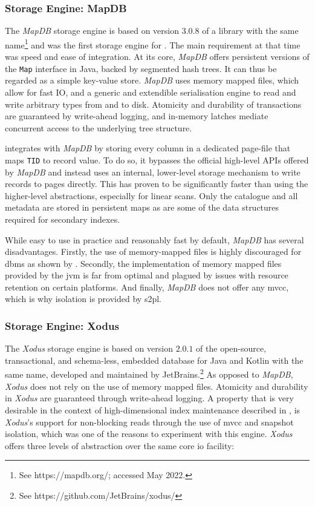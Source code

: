 \subsubsection{Storage Engine: MapDB}

The \emph{MapDB} storage engine is based on version $3.0.8$ of a library with the same name\footnote{See https://mapdb.org/; accessed May 2022.} and was the first storage engine for \cottontail{}. The main requirement at that time was speed and ease of integration. At its core, \emph{MapDB} offers persistent versions of the \texttt{Map} interface in Java, backed by segmented hash trees. It can thus be regarded as a simple key-value store. \emph{MapDB} uses memory mapped files, which allow for fast IO, and a generic and extendible serialisation engine to read and write arbitrary types from and to disk. Atomicity and durability of transactions are guaranteed by write-ahead logging, and in-memory latches mediate concurrent access to the underlying tree structure.

\cottontail{} integrates with \emph{MapDB} by storing every column in a dedicated page-file that maps \texttt{TID} to record value. To do so, it bypasses the official high-level APIs offered by \emph{MapDB} and instead uses an internal, lower-level storage mechanism to write records to pages directly. This has proven to be significantly faster than using the higher-level abstractions, especially for linear scans. Only the catalogue and all metadata are stored in persistent maps as are some of the data structures required for secondary indexes.

While easy to use in practice and reasonably fast by default, \emph{MapDB} has several disadvantages. Firstly, the use of memory-mapped files is highly discouraged for \acrshort{dbms} as shown by \cite{Crotty:2022Are}. Secondly, the implementation of memory mapped files provided by the \acrshort{jvm} is far from optimal and plagued by issues with resource retention on certain platforms. And finally, \emph{MapDB} does not offer any \acrshort{mvcc}, which is why isolation is provided by \acrshort{s2pl}.

\subsubsection{Storage Engine: Xodus}
The \emph{Xodus} storage engine is based on version $2.0.1$ of the open-source, transactional, and schema-less, embedded database for Java and Kotlin with the same name, developed and maintained by JetBrains.\footnote{See https://github.com/JetBrains/xodus/} As opposed to \emph{MapDB}, \emph{Xodus} does not rely on the use of memory mapped files. Atomicity and durability in \emph{Xodus} are guaranteed through write-ahead logging. A property that is very desirable in the context of high-dimensional index maintenance described in , is \emph{Xodus}'s support for non-blocking reads through the use of \acrshort{mvcc} and snapshot isolation, which was one of the reasons to experiment with this engine. \emph{Xodus} offers three levels of abstraction over the same core \acrshort{io} facility:

